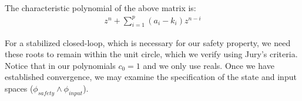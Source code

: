 \documentclass[runningheads,a4paper]{llncs}
\begin{document}
The characteristic polynomial of the above matrix is:
%
\begin{align*}
z^n+\sum_{i=1}^p{(a_i-k_i)z^{n-i}}
\end{align*}

For a stabilized closed-loop, which is necessary for our safety property, we need
these roots to remain within the unit circle, which we verify using Jury's criteria.
Notice that in our polynomials $c_0=1$ and we only use reals.
Once we have established convergence, we may examine the 
specification of the state and input spaces ($\phi_{safety} \wedge \phi_{input}$).
\end{document}
